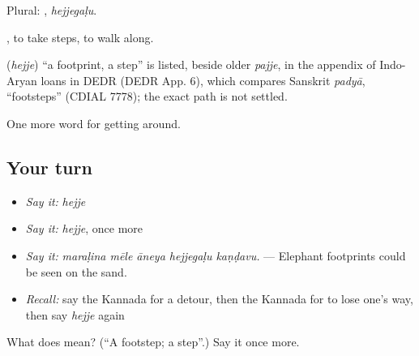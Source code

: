 Plural: , \emph{hejjegaḷu}.

 , to take steps, to walk along.

\begin{cousinweb}
\textbf{} (\emph{hejje}) \textquotedblleft{}a footprint, a step\textquotedblright{} is listed, beside older \emph{pajje}, in the appendix of Indo-Aryan loans in DEDR (DEDR App. 6), which compares Sanskrit \emph{padyā}, \textquotedblleft{}footsteps\textquotedblright{} (CDIAL 7778); the exact path is not settled.
\end{cousinweb}

\begin{grammarlens}[title={What you've built}]
One more word for getting around.
\end{grammarlens}

\subsection*{Your turn}
\begin{itemize}
\raggedright
  \item \emph{Say it:} \emph{hejje}
  \item \emph{Say it:} \emph{hejje}, once more
  \item \emph{Say it:} \emph{maraḷina mēle āneya hejjegaḷu kaṇḍavu.} — Elephant footprints could be seen on the sand.
  \item \emph{Recall:} say the Kannada for a detour, then the Kannada for to lose one's way, then say \emph{hejje} again
\end{itemize}

\begin{tcolorbox}[breakable,colback=teal!4,colframe=teal!35!black,title={Before you move on}]
What does  mean? (\textquotedblleft{}A footstep; a step\textquotedblright{}.) Say it once more.
\end{tcolorbox}
